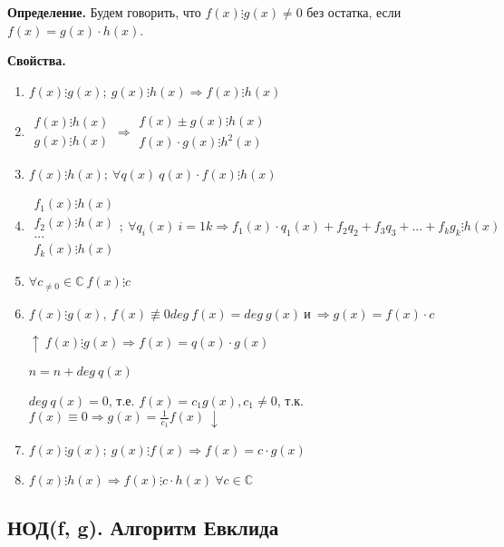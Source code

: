 \documentclass{article}
\begin{document}
    \textbf{Определение.} Будем говорить, что \(f(x) \vdots g(x) \neq 0\) без остатка, если \(f(x) = g(x)\cdot h(x)\).

    \textbf{Свойства.}

    \begin{enumerate}
        \item \(f(x) \vdots g(x);\ g(x) \vdots h(x) \Rightarrow f(x)\vdots h(x)\)
        \item \(\begin{array}{l}f(x) \vdots h(x)\\ g(x) \vdots h(x)\end{array} \Rightarrow \begin{array}{l}f(x) \pm g(x)\vdots h(x)\\ f(x) \cdot g(x)\vdots h^2(x)\end{array}\)
        \item \(f(x)\vdots h(x);\ \forall q(x)\ q(x)\cdot f(x)\vdots h(x)\)
        \item \(\begin{array}{l}f_1(x)\vdots h(x)\\ f_2(x)\vdots h(x)\\ ...\\ f_k(x)\vdots h(x)\end{array};\ \forall q_i(x)\ i=1k \Rightarrow f_1(x)\cdot q_1(x)+f_2q_2+f_3q_3+...+f_kg_k \vdots h(x)\)
        \item \(\forall c_{\neq 0} \in \mathbb{C}\ f(x)\vdots c\)
        \item \(f(x) \vdots g(x),\ f(x) \not \equiv 0 deg\ f(x) = deg\ g(x)\ \textrm{и}\ \Rightarrow g(x) = f(x) \cdot c\)
        
        \(\uparrow\ f(x)\vdots g(x) \Rightarrow f(x) = q(x)\cdot g(x)\)

        \(n = n + deg\ q(x)\)

        \(deg\ q(x) = 0\), т.е. \(f(x) = c_1g(x), c_1 \neq 0\), т.к. \(f(x) \equiv 0 \Rightarrow g(x) = \frac{1}{c_1}f(x)\ \downarrow\)
        
        \item \(f(x)\vdots g(x);\ g(x) \vdots f(x) \Rightarrow f(x) = c\cdot g(x)\)
        \item \(f(x) \vdots h(x) \Rightarrow f(x)\vdots c\cdot h(x)\ \forall c \in \mathbb{C}\)
        
    \end{enumerate}

    \subsection{НОД(f, g). Алгоритм Евклида}
\end{document}
